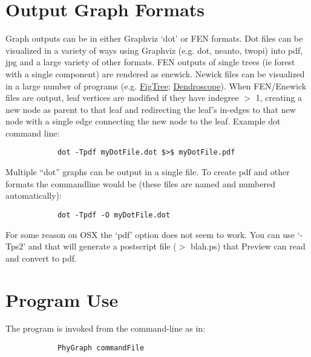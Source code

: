 \documentclass[11pt]{book}
\begin{document}
\section{Output Graph Formats}
	Graph outputs can be in either Graphviz `dot' or FEN formats.  Dot files can be visualized in a variety of ways 
	using Graphviz (e.g. dot, neanto, twopi) into pdf, jpg and a large variety of other formats. FEN outputs of 
	single trees (ie forest with a single component) are rendered as enewick.  Newick files can be visualized in a 
	large number of programs (e.g. \href{http://tree.bio.ed.ac.uk/software/figtree/}{FigTree}; 
	\href{http:/https://uni-tuebingen.de/fakultaeten/mathematisch-naturwissenschaftliche-fakultaet/fachbereiche/informatik/lehrstuehle/algorithms-in-bioinformatics/software/}
	{Dendroscope}). 	
	When FEN/Enewick files are output, leaf vertices are modified if they have indegree $>$ 1, creating a new node as parent to that leaf
	and redirecting the leaf's in-edges to that new node with a single edge connecting the new node to the leaf.  Example dot command line: 
	
		\begin{verbatim}
			dot -Tpdf myDotFile.dot $>$ myDotFile.pdf
		\end{verbatim}
		
	Multiple ``dot'' graphs can be output in a single file.  To create pdf and other formats the
	commandline would be (these files are named and numbered automatically):
	
		\begin{verbatim}
			dot -Tpdf -O myDotFile.dot
		\end{verbatim}
		
	For some reason on OSX the `pdf' option does not seem to work.  You can use `-Tps2' and that will generate 
	a postscript file ($>$ blah.ps) that Preview can read and convert to pdf.
	
\section{Program Use}
	The program is invoked from the command-line as in:
	
		\begin{verbatim}
			PhyGraph commandFile
		\end{verbatim}	

	
\end{document}
